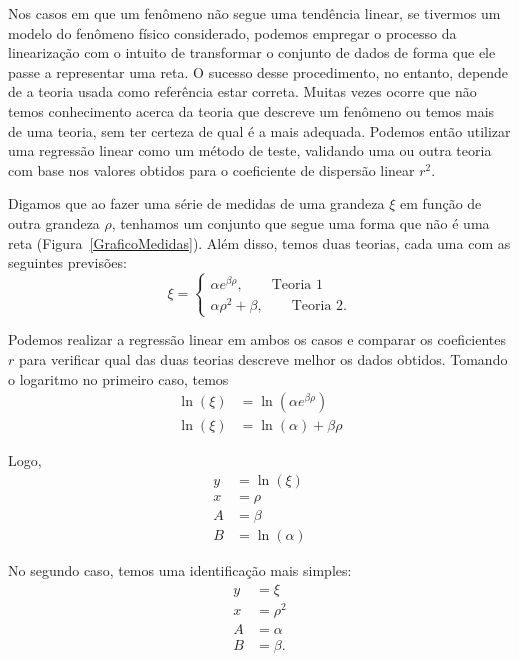 Nos casos em que um fenômeno não segue uma tendência linear, se tivermos um modelo do fenômeno físico considerado, podemos empregar o processo da linearização com o intuito de transformar o conjunto de dados de forma que ele passe a representar uma reta. O sucesso desse procedimento, no entanto, depende de a teoria usada como referência estar correta. Muitas vezes ocorre que não temos conhecimento acerca da teoria que descreve um fenômeno ou temos mais de uma teoria, sem ter certeza de qual é a mais adequada. Podemos então utilizar uma regressão linear como um método de teste, validando uma ou outra teoria com base nos valores obtidos para o coeficiente de dispersão linear $r^2$.

Digamos que ao fazer uma série de medidas de uma grandeza $\xi$ em função de outra grandeza $\rho$, tenhamos um conjunto que segue uma forma que não é uma reta (Figura~\ref{GraficoMedidas}). Além disso, temos duas teorias, cada uma com as seguintes previsões:
\begin{equation}
	\xi =\begin{cases} \alpha e^{\beta\rho}, \qquad\textrm{Teoria 1} \\
	\alpha\rho^2 + \beta, \qquad\textrm{Teoria 2.} \end{cases}
\end{equation}

\begin{figure*}
\centering
\forceversofloat
\caption{Dados medidos de $\xi$ em função de $\rho$. Visivelmente o comportamento é não linear.}
\label{GraficoMedidas}

\end{figure*}

\noindent{}Podemos realizar a regressão linear em ambos os casos e comparar os coeficientes $r$ para verificar qual das duas teorias descreve melhor os dados obtidos. Tomando o logaritmo no primeiro caso, temos
\begin{align}
	\ln(\xi) &= \ln(\alpha e^{\beta\rho}) \\
	\ln(\xi) &= \ln(\alpha) + \beta\rho
\end{align}

\noindent{}Logo,
\begin{align}
	y &= \ln(\xi) \\
	x &= \rho \\
	A &= \beta \\
	B &= \ln(\alpha)
\end{align}

No segundo caso, temos uma identificação mais simples:
\begin{align}
	y &= \xi \\
	x &= \rho^2 \\
	A &= \alpha \\
	B &= \beta.
\end{align}

